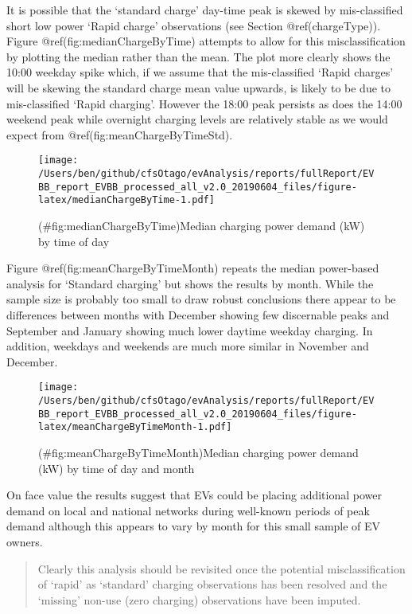 \documentclass[]{article}
\begin{document}
It is possible that the `standard charge' day-time peak is skewed by mis-classified short low power `Rapid charge' observations (see Section @ref(chargeType)). Figure @ref(fig:medianChargeByTime) attempts to allow for this misclassification by plotting the median rather than the mean. The plot more clearly shows the 10:00 weekday spike which, if we assume that the mis-classified `Rapid charges' will be skewing the standard charge mean value upwards, is likely to be due to mis-classified `Rapid charging'. However the 18:00 peak persists as does the 14:00 weekend peak while overnight charging levels are relatively stable as we would expect from @ref(fig:meanChargeByTimeStd).

\begin{figure}
\centering
\texttt{[image: /Users/ben/github/cfsOtago/evAnalysis/reports/fullReport/EVBB\_report\_EVBB\_processed\_all\_v2.0\_20190604\_files/figure-latex/medianChargeByTime-1.pdf]}
\caption{(\#fig:medianChargeByTime)Median charging power demand (kW) by time of day}
\end{figure}

Figure @ref(fig:meanChargeByTimeMonth) repeats the median power-based analysis for `Standard charging' but shows the results by month. While the sample size is probably too small to draw robust conclusions there appear to be differences between months with December showing few discernable peaks and September and January showing much lower daytime weekday charging. In addition, weekdays and weekends are much more similar in November and December.

\begin{figure}
\centering
\texttt{[image: /Users/ben/github/cfsOtago/evAnalysis/reports/fullReport/EVBB\_report\_EVBB\_processed\_all\_v2.0\_20190604\_files/figure-latex/meanChargeByTimeMonth-1.pdf]}
\caption{(\#fig:meanChargeByTimeMonth)Median charging power demand (kW) by time of day and month}
\end{figure}

On face value the results suggest that EVs could be placing additional power demand on local and national networks during well-known periods of peak demand although this appears to vary by month for this small sample of EV owners.

\begin{quote}
Clearly this analysis should be revisited once the potential misclassification of `rapid' as `standard' charging observations has been resolved and the `missing' non-use (zero charging) observations have been imputed.
\end{quote}
\end{document}
